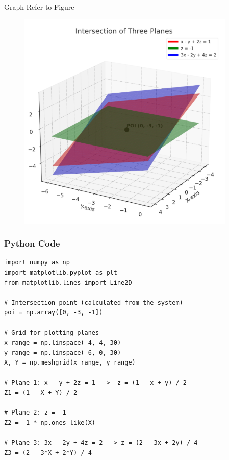 \documentclass{beamer}
\begin{document}
\begin{frame}{Graph}
   Refer to Figure

\begin{figure}[H]
\begin{center}
\includegraphics[width=0.6\columnwidth]{../figs/graph9.png}
\end{center}
\caption{}
\label{fig:Fig}
\end{figure}  
\end{frame}




\begin{frame}[fragile]
    \frametitle{Python Code}
    \begin{lstlisting}
import numpy as np
import matplotlib.pyplot as plt
from matplotlib.lines import Line2D

# Intersection point (calculated from the system)
poi = np.array([0, -3, -1])

# Grid for plotting planes
x_range = np.linspace(-4, 4, 30)
y_range = np.linspace(-6, 0, 30)
X, Y = np.meshgrid(x_range, y_range)

# Plane 1: x - y + 2z = 1  ->  z = (1 - x + y) / 2
Z1 = (1 - X + Y) / 2

# Plane 2: z = -1
Z2 = -1 * np.ones_like(X)

# Plane 3: 3x - 2y + 4z = 2  -> z = (2 - 3x + 2y) / 4
Z3 = (2 - 3*X + 2*Y) / 4
\end{lstlisting}
\end{frame}
\end{document}
